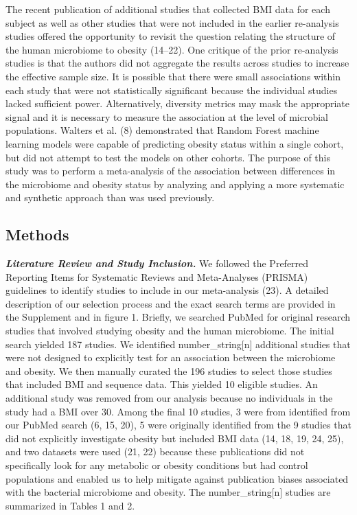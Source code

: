 \documentclass[12pt,]{article}
\begin{document}
The recent publication of additional studies that collected BMI data for
each subject as well as other studies that were not included in the
earlier re-analysis studies offered the opportunity to revisit the
question relating the structure of the human microbiome to obesity
(14--22). One critique of the prior re-analysis studies is that the
authors did not aggregate the results across studies to increase the
effective sample size. It is possible that there were small associations
within each study that were not statistically significant because the
individual studies lacked sufficient power. Alternatively, diversity
metrics may mask the appropriate signal and it is necessary to measure
the association at the level of microbial populations. Walters et al.
(8) demonstrated that Random Forest machine learning models were capable
of predicting obesity status within a single cohort, but did not attempt
to test the models on other cohorts. The purpose of this study was to
perform a meta-analysis of the association between differences in the
microbiome and obesity status by analyzing and applying a more
systematic and synthetic approach than was used previously.

\subsection{Methods}\label{methods}

\textbf{\emph{Literature Review and Study Inclusion.}} We followed the
Preferred Reporting Items for Systematic Reviews and Meta-Analyses
(PRISMA) guidelines to identify studies to include in our meta-analysis
(23). A detailed description of our selection process and the exact
search terms are provided in the Supplement and in figure 1. Briefly, we
searched PubMed for original research studies that involved studying
obesity and the human microbiome. The initial search yielded 187
studies. We identified number\_string{[}n{]} additional studies that
were not designed to explicitly test for an association between the
microbiome and obesity. We then manually curated the 196 studies to
select those studies that included BMI and sequence data. This yielded
10 eligible studies. An additional study was removed from our analysis
because no individuals in the study had a BMI over 30. Among the final
10 studies, 3 were from identified from our PubMed search (6, 15, 20), 5
were originally identified from the 9 studies that did not explicitly
investigate obesity but included BMI data (14, 18, 19, 24, 25), and two
datasets were used (21, 22) because these publications did not
specifically look for any metabolic or obesity conditions but had
control populations and enabled us to help mitigate against publication
biases associated with the bacterial microbiome and obesity. The
number\_string{[}n{]} studies are summarized in Tables 1 and 2.
\end{document}

